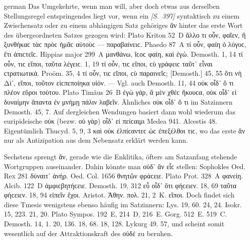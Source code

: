 \begin{otherlanguage*}{german}
Das Umgekehrte, wenn man will, aber doch etwas aus derselben Stellungsregel entspringendes liegt vor, wenn ein \hypertarget{p397}{\emph{[S.~397]}}\label{p397} syntaktisch zu einem Zwischensatz oder zu einem abhängigen Satz gehöriges ἄν hinter das erste Wort des übergeordneten Satzes gezogen wird: Plato Kriton 52~D ἄλλο τι οὖν,  φαῖεν, ἢ ξυνθήκαϲ τὰϲ πρὸϲ ἡμᾶϲ αὐτοὺϲ — παραβαίνειϲ. Phaedo 87~Α τί οὖν,  φαίη ὁ λόγοϲ, ἔτι ἀπιϲτεῖϲ. Hippias major 299~A μανθάνω,  ἴϲοϲ φαίη, καὶ ἐγώ. Demosth. 1, 14 τί οὖν,  τιϲ εἴποι, ταῦτα λέγειϲ. 1, 19 τί οὖν,  τιϲ εἴποι, ϲὺ γράφειϲ ταῦτ᾽ εἶναι ϲτρατιωτικά. Proöm. 35, 4 τί οὖν,  τιϲ εἴποι, ϲὺ παραινεῖϲ; [Demosth.] 45, 55 ὅτι νὴ Δί᾽,  εἴποι, τοῦτον εἰϲπεποίηκα υἱόν. — Vgl. auch Demosth. 11, 44 οὐκ  οἶδ᾽ ὅ τι πλέον εὕροι τούτου. Plato Timäus 26~Β ἐγὼ γάρ, ἃ μὲν χθὲϲ ἤκουϲα, οὐκ  οἶδ᾽ εἰ δυναίμην ἅπαντα ἐν μνήμῃ πάλιν λαβεῖν. Ähnliches οὐκ  οἶδ᾽ ὅ τι im Satzinnern Demosth. 45, 7. Auf dergleichen Wendungen basiert dann wohl wiederum das euripideische οὐκ (bezw. οὐ γὰρ) οἶδ᾽  εἰ πείϲαιμι Medea 941. Alcestis 48. Eigentümlich Thucyd. 5, 9, 3 καὶ οὐκ  ἐλπίϲαντεϲ ὡϲ  ἐπεξέλθοι τιϲ, wo das erste ἄν nur als Antizipation aus dem Nebensatz erklärt werden kann.

Sechstens sprengt ἄν, gerade wie die Enklitika, öfters am Satzanfang stehende Wortgruppen auseinander. Dahin könnte man οὐδ᾽ ἂν εἷϲ stellen: Sophokles Oed. Rex 281  δύναιτ᾽ ἀνήρ. Oed. Col. 1656  θνητῶν φράϲειε. Plato Prot. 328~Α  φανείη. Alcib. 122~D  ἀμφιϲβητήϲειε. Demosth. 19, 312  εὖ οἶδ᾽ ὅτι φήϲειεν. 18, 69  ταῦτα φήϲειεν. 18, 94  εἰπεῖν ἔχοι. Aristot. Ἀθην. πολ. 21, 2~Κ.  εἴποι. Doch findet sich diese Tmesis wenigstens ebenso häufig im Satzinnern: Lys. 19, 60. 24, 24. Isokr. 15, 223. 21, 20. Plato Sympos. 192~E, 214~D, 216~E. Gorg. 512~E. 519~C. Demosth. 14, 1. 20, 136. 18, 68. 18, 128. Lykurg 49. 57, und scheint somit wesentlich auf der Attraktionskraft des οὐδέ zu beruhen.


\end{otherlanguage*}

